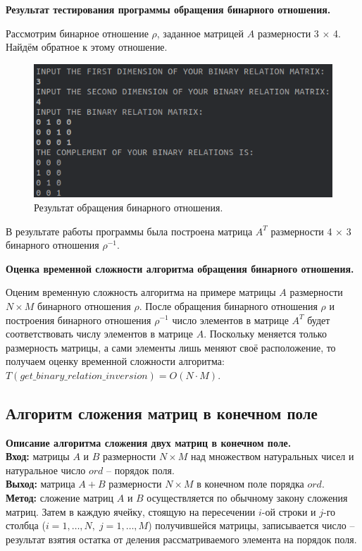\documentclass[spec, och, otchet, hidelinks]{SCWorks}
\newcommand{\tbf}[1]{\textbf{#1}}
\begin{document}
\newpage

\par \tbf{Результат тестирования программы обращения бинарного отношения.}
\par Рассмотрим бинарное отношение $\rho$, заданное матрицей $A$ размерности 3
$\times$ 4. Найдём обратное к этому отношение.

\begin{figure}[h]
  \center\includegraphics[scale=0.7]{binary_relation_inversion.png}
  \caption{Результат обращения бинарного отношения.}
\end{figure}

\par В результате работы программы была построена матрица $A^{T}$ размерности 4
$\times$ 3 бинарного отношения $\rho^{-1}$. \\

\par \tbf{Оценка временной сложности алгоритма обращения бинарного отношения.}
\par Оценим временную сложность алгоритма на примере матрицы $A$ размерности $N
\times M$ бинарного отношения $\rho$. После обращения бинарного отношения $\rho$
и построения бинарного отношения $\rho^{-1}$ число элементов в матрице $A^T$
будет соответствовать числу элементов в матрице $A$. Поскольку меняется только
размерность матрицы, а сами элементы лишь меняют своё расположение, то получаем
оценку временной сложности алгоритма: $T(get\_binary\_relation\_inversion) = O(N
\cdot M)$.

\newpage

\subsection{Алгоритм сложения матриц в конечном поле}
\par \tbf{Описание алгоритма сложения двух матриц в конечном поле.} \\
\tbf{Вход:} матрицы $A$ и $B$ размерности $N \times M$ над множеством
натуральных чисел и натуральное число $ord$ -- порядок поля. \\
\tbf{Выход:} матрица $A + B$ размерности $N \times M$ в конечном поле порядка
$ord$. \\
\tbf{Метод:} сложение матриц $A$ и $B$ осуществляется по обычному закону
сложения матриц. Затем в каждую ячейку, стоящую на пересечении $i$-ой строки и
$j$-го столбца ($i = 1,\dots,N, \; j = 1,\dots,M$) получившейся матрицы, записывается число
-- результат взятия остатка от деления рассматриваемого элемента на порядок поля.
\end{document}

